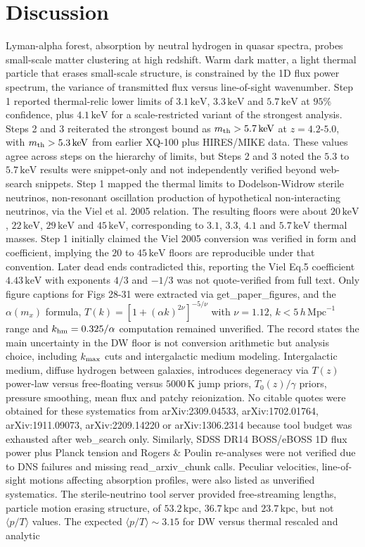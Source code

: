 \documentclass[11pt,a4paper]{article}
\begin{document}
\section{Discussion}
Lyman-alpha forest, absorption by neutral hydrogen in quasar spectra, probes small-scale matter clustering at high redshift. Warm dark matter, a light thermal particle that erases small-scale structure, is constrained by the 1D flux power spectrum, the variance of transmitted flux versus line-of-sight wavenumber. Step 1 reported thermal-relic lower limits of $3.1\,\mathrm{keV}$, $3.3\,\mathrm{keV}$ and $5.7\,\mathrm{keV}$ at $95\%$ confidence, plus $4.1\,\mathrm{keV}$ for a scale-restricted variant of the strongest analysis. Steps 2 and 3 reiterated the strongest bound as $m_{\rm th} > 5.7\,\mathrm{keV}$ at $z = 4.2$-$5.0$, with $m_{\rm th} > 5.3\,\mathrm{keV}$ from earlier XQ-100 plus HIRES/MIKE data. These values agree across steps on the hierarchy of limits, but Steps 2 and 3 noted the $5.3$ to $5.7\,\mathrm{keV}$ results were snippet-only and not independently verified beyond web-search snippets. Step 1 mapped the thermal limits to Dodelson-Widrow sterile neutrinos, non-resonant oscillation production of hypothetical non-interacting neutrinos, via the Viel et al. 2005 relation. The resulting floors were about $20\,\mathrm{keV}$, $22\,\mathrm{keV}$, $29\,\mathrm{keV}$ and $45\,\mathrm{keV}$, corresponding to $3.1$, $3.3$, $4.1$ and $5.7\,\mathrm{keV}$ thermal masses. Step 1 initially claimed the Viel 2005 conversion was verified in form and coefficient, implying the $20$ to $45\,\mathrm{keV}$ floors are reproducible under that convention. Later dead ends contradicted this, reporting the Viel Eq.5 coefficient $4.43\,\mathrm{keV}$ with exponents $4/3$ and $-1/3$ was not quote-verified from full text. Only figure captions for Figs 28-31 were extracted via get\_paper\_figures, and the $\alpha(m_x)$ formula, $T(k)=[1+(\alpha k)^{2\nu}]^{-5/\nu}$ with $\nu=1.12$, $k<5\,h\,\mathrm{Mpc}^{-1}$ range and $k_{\rm hm}=0.325/\alpha$ computation remained unverified. The record states the main uncertainty in the DW floor is not conversion arithmetic but analysis choice, including $k_{\rm max}$ cuts and intergalactic medium modeling. Intergalactic medium, diffuse hydrogen between galaxies, introduces degeneracy via $T(z)$ power-law versus free-floating versus $5000\,\mathrm{K}$ jump priors, $T_0(z)/\gamma$ priors, pressure smoothing, mean flux and patchy reionization. No citable quotes were obtained for these systematics from arXiv:2309.04533, arXiv:1702.01764, arXiv:1911.09073, arXiv:2209.14220 or arXiv:1306.2314 because tool budget was exhausted after web\_search only. Similarly, SDSS DR14 BOSS/eBOSS 1D flux power plus Planck tension and Rogers \& Poulin re-analyses were not verified due to DNS failures and missing read\_arxiv\_chunk calls. Peculiar velocities, line-of-sight motions affecting absorption profiles, were also listed as unverified systematics. The sterile-neutrino tool server provided free-streaming lengths, particle motion erasing structure, of $53.2\,\mathrm{kpc}$, $36.7\,\mathrm{kpc}$ and $23.7\,\mathrm{kpc}$, but not $\langle p/T \rangle$ values. The expected $\langle p/T \rangle \sim 3.15$ for DW versus thermal rescaled and analytic 
\end{document}
